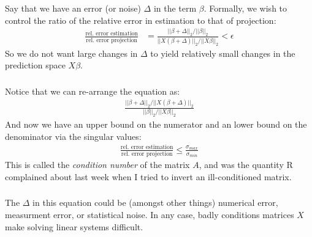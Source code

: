 \begin{frame}[fragile] \frametitle{}

Say that we have an error (or noise) $\Delta$ in the term $\beta$.
Formally, we  wish to control the ratio of the relative error in
estimation to that of projection: \pause
\begin{align*}
\frac{\text{rel. error estimation}}{\text{rel. error projection}}
 &= \frac{|| \beta + \Delta ||_2 / || \beta ||_2}{|| X(\beta + \Delta) ||_2 / || X\beta ||_2}
 < \epsilon
\end{align*}
\pause So we do not want large changes in $\Delta$ to yield relatively
small changes in the prediction space $X\beta$.

\end{frame}

\begin{frame}[fragile] \frametitle{}

Notice that we can re-arrange the equation as:
\begin{align*}
\frac{|| \beta + \Delta ||_2 / || X(\beta + \Delta) ||_2}{|| \beta ||_2 / || X\beta ||_2}
\end{align*}
And now we have an upper bound on the numerator and an lower bound on the
denominator via the singular values:
\begin{align*}
\frac{\text{rel. error estimation}}{\text{rel. error projection}} \leq \frac{\sigma_{max}}{\sigma_{min}}
\end{align*}
\pause This is called the \textit{condition number} of the matrix $A$, and was the
quantity R complained about last week when I tried to invert an ill-conditioned
matrix.

\end{frame}

\begin{frame}[fragile] \frametitle{}

The $\Delta$ in this equation could be (amongst other things)
numerical error, measurment error, or statistical noise. In any
case, badly conditions matrices $X$ make solving linear systems
difficult.

\end{frame}

